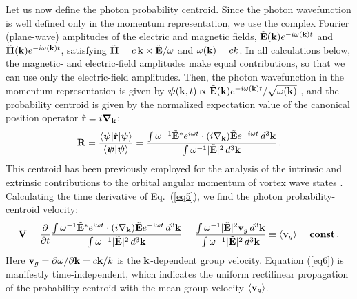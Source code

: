 \documentclass[12pt, a4paper, superscriptaddress, final]{iopart}
\begin{document}
Let us now define the photon probability centroid. Since the photon wavefunction is well defined only in the momentum representation, we use the complex Fourier (plane-wave) amplitudes of the electric and magnetic fields, $\tilde{\bf E}({\bf k})e^{-i\omega({\bf k})t}$ and $\tilde{\bf H}({\bf k})e^{-i\omega({\bf k})t}$, satisfying $\tilde{\bf H} = c\,{\bf k} \times \tilde{\bf E}/\omega$ and $ \omega ({\bf k}) = c k$. In all calculations below, the magnetic- and electric-field amplitudes make equal contributions, so that we can use only the electric-field amplitudes. Then, the photon wavefunction in the momentum representation is given by ${\bm \psi} ({\bf k},t) \propto \tilde{\bf E}({\bf k})e^{-i\omega({\bf k})t} / \sqrt{\omega({\bf k})}$ \cite{CT, BB1996, Smirnova2018, Bliokh2023}, and the probability centroid is given by the normalized expectation value of the canonical position operator $\hat{\bf r} = i {\bm \nabla}_{\bf k}$:
%
\begin{equation}
\label{eq5}
{\bf R} = \frac{\langle {\bm \psi} | \hat{\bf r} | {\bm \psi} \rangle}{\langle {\bm \psi} | {\bm \psi} \rangle} =
\frac{ \int  \omega^{-1} \tilde{\bf E}^*e^{i\omega t} \cdot (i{\nabla}_{\bf k}) \tilde{\bf E}e^{-i\omega t} \, d^3{\bf k}}{\int \omega^{-1} |\tilde{\bf E}|^2 \, d^3{\bf k}}\,.
 \end{equation}
%	
This centroid has been previously employed for the analysis of the intrinsic and extrinsic contributions to the orbital angular momentum of vortex wave states \cite{ Bliokh2012PRL, Bliokh2012, Smirnova2018, Bliokh2023}. Calculating the time derivative of Eq.~(\ref{eq5}), we find the photon probability-centroid velocity:
%
\begin{equation}
\label{eq6}
{\bf V} = \frac{\partial}{\partial t} \frac{ \int  \omega^{-1} \tilde{\bf E}^*e^{i\omega t} \cdot (i{\nabla}_{\bf k}) \tilde{\bf E}e^{-i\omega t} \, d^3{\bf k}}{\int \omega^{-1} |\tilde{\bf E}|^2 \, d^3{\bf k}} =
\frac{ \int  \omega^{-1} |\tilde{\bf E}|^2 {\bf v}_g \, d^3{\bf k}}{\int \omega^{-1} |\tilde{\bf E}|^2 \, d^3{\bf k}} \equiv \langle {\bf v}_g \rangle= {\bf const}\,.
 \end{equation}
%	
Here ${\bf v}_g = \partial \omega/\partial {\bf k} = c{\bf k}/k$ is the ${\bf k}$-dependent group velocity. Equation (\ref{eq6}) is manifestly time-independent, which indicates the uniform rectilinear propagation of the probability centroid with the mean group velocity $\langle {\bf v}_g \rangle$. 
\end{document}

